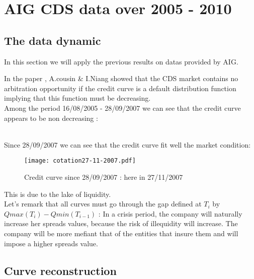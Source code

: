 
\section{AIG CDS data over 2005 - 2010}
\label{sec:aig-cds-data}

\subsection{The data dynamic}
\label{sec:data-dynamic}
In this section we will apply the previous results on datas provided by AIG.

In the paper \cite{OTRATS}, A.cousin \& I.Niang showed that the CDS market contains
no  arbitration   opportunity  if  the credit  curve   is  a   default  distribution
function implying that this function must be  decreasing.\\
Among  the period  16/08/2005 -  28/09/2007  we can  see that  the credit  curve
appears to be non decreasing :

\\
Since 28/09/2007 we can see that the credit curve fit well the market condition:

\begin{figure}[H]
  \centering
  \texttt{[image: cotation27-11-2007.pdf]}
  \caption{Credit curve since 28/09/2007 : here in 27/11/2007}
\end{figure}

This is due to the lake of liquidity.\\
Let's remark that all curves must go through the gap defined at $T_i$ by
 $Qmax(T_{i})-Qmin(T_{i-1})$ :
In a  crisis period,  the company  will naturally  increase her  spreads values,
because the risk of illequidity will  increase. The company will be more mefiant
that of the entities that insure them and will impose a higher spreads value.

\subsection{Curve reconstruction}
\label{sec:curve-reconstruction}

